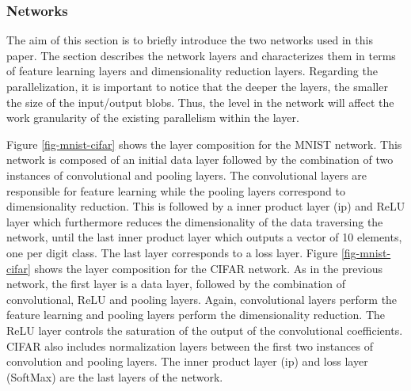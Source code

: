\subsubsection{Networks}
The aim of this section is to briefly introduce the two networks 
used in this paper. The section describes the network layers and characterizes 
them in terms of feature learning layers and dimensionality reduction 
layers. Regarding the parallelization, it is important to notice that 
the deeper the layers, the smaller the size of the input/output blobs. 
Thus, the level in the network will affect the work granularity of the 
existing parallelism within the layer. 

Figure \ref{fig-mnist-cifar} shows the layer composition for the MNIST network. 
This network is composed of an initial data layer followed by the 
combination of two instances of convolutional and pooling layers. The 
convolutional layers are responsible for feature learning while the 
pooling layers correspond to dimensionality reduction. 
This is followed by a inner product layer (ip) and ReLU layer which furthermore reduces the dimensionality 
of the data traversing the network, until the last inner product layer which 
outputs a vector of 10 elements, one per digit class. The last layer 
corresponds to a loss layer.  
Figure \ref{fig-mnist-cifar} shows the layer composition for the CIFAR network. 
As in the previous network, the first layer is a data layer, followed by 
the combination of convolutional, ReLU and pooling layers. Again, convolutional 
layers perform the feature learning and pooling layers perform the 
dimensionality reduction. The ReLU layer controls the saturation of 
the output of the convolutional coefficients. CIFAR also includes 
normalization layers between the first two instances of convolution and pooling 
layers.  The inner product layer (ip) and loss layer (SoftMax) are the last layers of the network. 

